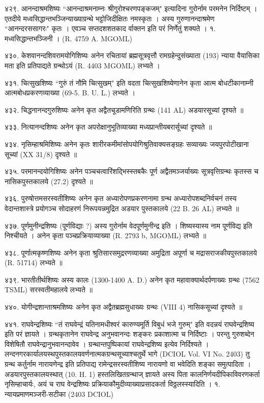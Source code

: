 ४२९. आनन्दाश्रमशिष्यः 
``आनन्दाश्रमनाम्नः श्रीगुरोश्चरणपङ्कजम्" इत्यादिना गुरोर्नाम परमनेन निर्दिष्टम् । एतदीये मध्वसिद्धान्तभञ्जिन्याख्याग्रन्थे भट्टोजिदीक्षितः नमस्कृतः । अस्य गुरुणानन्दाश्रमेण ``आनन्दरससागरः" कृतः । एवञ्च सप्तदशशतकाद र्वाक्तन इति परं निर्णेतुं शक्यते ।
१. मध्वसिद्धान्तभञ्जिनी । (R. 4759 A. MGOML)

४३०. केशवानन्दशिवरामयोगिशिष्यः
अनेन रचितायां ब्रह्मसूत्रवृत्तौ रामग्रहेन्दुसंख्याता (193) न्याया वैयासिका मता इति प्रतिपाद्यते ग्रन्थोऽयं (R. 4403 MGOML) लभ्यते ।

४३१. चित्सुखशिष्यः
``गुरुं तं नौमि चित्सुखम्" इति वदता चित्सुखशिष्येणानेन कृता आत्म बोधटीकानाम्नी आत्मबोधप्रकरणव्याख्या (69-5. B. U. L.) लभ्यते ।

४३२. चिद्धनानन्दगुरुशिष्यः
अनेन कृत अद्वैतचूडामणिरिति ग्रन्थः (141 AL) अडयारसूच्यां दृश्यते ॥

४३३. नित्यानन्दशिष्यः
अनेन कृत अपरोक्षानुभूतिव्याख्या मध्यप्रान्तीयबरार्सूच्यां दृश्यते ॥

४३४. नृसिम्हाश्रमिशिष्यः 
अनेन कृतः शारीरकमीमांसोपयोगिश्रुतिवाक्यसङ्ग्रहः सव्याख्यः जयपुरपोटीखाना सूच्यां (XX 31/8) दृश्यते ॥

४३५. परमानन्दयोगिशिष्यः
अनेन पञ्चचत्वारिंशद्भिस्स्तबकैः पूर्ण अद्वैतमञ्जर्याख्यः सूत्रवृत्तिग्रन्थः कृतस्स च नासिकपुस्तकालये (27.2) दृश्यते ॥

४३६. पुरुषोत्तमसरस्वतीशिष्यः 
अनेन कृत अध्यारोपणप्रकरणनामा ग्रन्थ अध्यारोपशब्दनिर्वचनं तस्य वेदान्तशास्त्रे प्रयोगञ्च सोदाहरणं निरूपयन्नमुद्रित अडयार पुस्तकालये (22 B. 26 AL) लभ्यते ॥

४३७. पूर्णमुनीन्द्रशिष्यः (पूर्णविद्याः ?)
अस्य गुरोर्नाम वेदपूर्णमुनीन्द्र इति । शिष्यस्यास्य नाम पूर्णविद्य इति निश्चीयते । अनेन कृता पञ्चप्रक्रियाव्याख्या (R. 2793 b, MGOML) लभ्यते ॥

४३८. पूर्णात्मकृष्णशिष्यः
अनेन कृता श्रुतिसारसमुद्ररणव्याख्या अमुद्रिता अपूर्णा च मद्रासराजकीयपुस्तकालये (R. 51714) लभ्यते ॥

४३९. भारतीतीर्थशिष्यः
अस्य कालः (1300-1400 A. D.) अनेन कृत महावाक्यार्थदर्पणाख्यः ग्रन्थः (7562 TSML) सरस्वतीमहालये लभ्यते ॥

४४०. योगीन्द्रशान्ताश्रमशिष्यः
अनेन कृत अद्वैतब्रह्मसुधाख्यः ग्रन्थः (VIII 4) नासिकसूच्यां दृश्यते ॥

४४१. राघवेन्द्रशिष्यः
``तं राघवेन्द्रं यतिनामधीश्वरं कारुण्यमूर्ति विबुधं भजे गुरुम्" इति वदन्नयं राघवेन्द्रशिष्य इति परं ज्ञायते । ग्रन्थकृतानेन राघवेन्द्र अनुभवानन्दः शङ्करः प्रकाशात्मा च निर्दिष्टाः । परन्तु गुरुशब्देन विशेषितौ राघवेन्द्रानुभवानन्दावेव । ग्रन्थान्तपुष्पिकायां राघवेन्द्रशिष्य इत्येव निर्दिश्यते । लन्दनगरकार्यालयस्थपुस्तकालयवर्णनात्मकग्रन्थसूच्याश्चतुर्थे भागे (DCIOL Vol. VI No. 2403) तु ग्रन्थ कर्तुर्नाम नारायणेन्द्र इति प्रतिपाद्य रामेन्द्रसरस्वतीशिष्य नारायणो वा भवेदिति शङ्का समुत्पादिता । अडयारपुस्तकालयस्थात् (10. H. 1) हस्तलिखितग्रन्थाज् ज्ञायते अस्य पिता कालनिर्णयदीपिकाविवरणकर्ता नृसिम्हाचार्यः, अयं च राघ वेन्द्रशिष्यः प्रक्रियाकौमुदीव्याख्याप्रसादकर्ता विठ्ठलस्स्यादिति ।
१. न्यायप्रमाणमञ्जरी-सटीका (2403 DCIOL)

